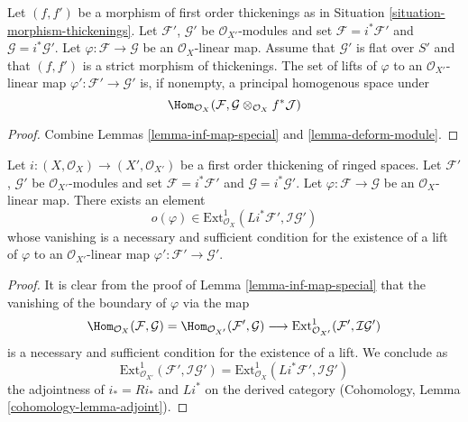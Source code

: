 \begin{lemma}
\label{lemma-inf-map-rel}
Let $(f, f')$ be a morphism of first order thickenings as in
Situation \ref{situation-morphism-thickenings}.
Let $\mathcal{F}'$, $\mathcal{G}'$ be $\mathcal{O}_{X'}$-modules and set
$\mathcal{F} = i^*\mathcal{F}'$ and $\mathcal{G} = i^*\mathcal{G}'$.
Let $\varphi : \mathcal{F} \to \mathcal{G}$ be an $\mathcal{O}_X$-linear map.
Assume that $\mathcal{G}'$ is flat over $S'$ and that
$(f, f')$ is a strict morphism of thickenings.
The set of lifts of $\varphi$ to an $\mathcal{O}_{X'}$-linear map
$\varphi' : \mathcal{F}' \to \mathcal{G}'$ is, if nonempty, a principal
homogenous space under
$$
\Hom_{\mathcal{O}_X}(\mathcal{F},
\mathcal{G} \otimes_{\mathcal{O}_X} f^*\mathcal{J})
$$
\end{lemma}

\begin{proof}
Combine Lemmas \ref{lemma-inf-map-special} and \ref{lemma-deform-module}.
\end{proof}

\begin{lemma}
\label{lemma-inf-obs-map-special}
Let $i : (X, \mathcal{O}_X) \to (X', \mathcal{O}_{X'})$
be a first order thickening of ringed spaces.
Let $\mathcal{F}'$, $\mathcal{G}'$ be $\mathcal{O}_{X'}$-modules and set
$\mathcal{F} = i^*\mathcal{F}'$ and $\mathcal{G} = i^*\mathcal{G}'$.
Let $\varphi : \mathcal{F} \to \mathcal{G}$ be an $\mathcal{O}_X$-linear map.
There exists an element
$$
o(\varphi) \in
\text{Ext}^1_{\mathcal{O}_X}(Li^*\mathcal{F}',
\mathcal{I}\mathcal{G}')
$$
whose vanishing is a necessary and sufficient condition for the
existence of a lift of $\varphi$ to an $\mathcal{O}_{X'}$-linear map
$\varphi' : \mathcal{F}' \to \mathcal{G}'$.
\end{lemma}

\begin{proof}
It is clear from the proof of Lemma \ref{lemma-inf-map-special} that the
vanishing of the boundary of $\varphi$ via the map
$$
\Hom_{\mathcal{O}_X}(\mathcal{F}, \mathcal{G}) =
\Hom_{\mathcal{O}_{X'}}(\mathcal{F}', \mathcal{G}) \longrightarrow
\text{Ext}^1_{\mathcal{O}_{X'}}(\mathcal{F}', \mathcal{I}\mathcal{G}')
$$
is a necessary and sufficient condition for the existence of a lift. We
conclude as
$$
\text{Ext}^1_{\mathcal{O}_{X'}}(\mathcal{F}', \mathcal{I}\mathcal{G}') =
\text{Ext}^1_{\mathcal{O}_X}(Li^*\mathcal{F}', \mathcal{I}\mathcal{G}')
$$
the adjointness of $i_* = Ri_*$ and $Li^*$ on the derived category
(Cohomology, Lemma \ref{cohomology-lemma-adjoint}).
\end{proof}


